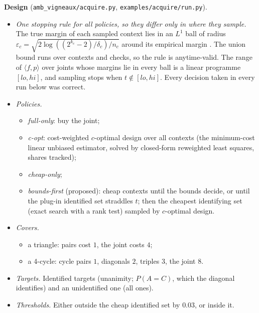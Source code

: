 \documentclass[11pt]{article}
\theoremstyle{definition}
\theoremstyle{remark}
\begin{document}
\textbf{Design} (\texttt{amb\_vigneaux/acquire.py}, \texttt{examples/acquire/run.py}).
\begin{itemize}
  \item \emph{One stopping rule for all policies, so they differ only in where they sample.} The true margin of each sampled context lies in an $L^1$ ball of radius $\varepsilon_c=\sqrt{2\log((2^{k_c}-2)/\delta_c)/n_c}$ around its empirical margin \cite{weissman03}. The union bound runs over contexts and checks, so the rule is anytime-valid. The range of $\langle f,p\rangle$ over joints whose margins lie in every ball is a linear programme $[lo,hi]$, and sampling stops when $t\notin[lo,hi]$. Every decision taken in every run below was correct.
  \item \emph{Policies.}
  \begin{itemize}
    \item \emph{full-only}: buy the joint;
    \item \emph{c-opt}: cost-weighted $c$-optimal design \cite{kieferwolfowitz60,pukelsheim93} over all contexts (the minimum-cost linear unbiased estimator, solved by closed-form reweighted least squares, shares tracked);
    \item \emph{cheap-only};
    \item \emph{bounds-first} (proposed): cheap contexts until the bounds decide, or until the plug-in identified set straddles $t$; then the cheapest identifying set (exact search with a rank test) sampled by $c$-optimal design.
  \end{itemize}
  \item \emph{Covers.}
  \begin{itemize}
    \item a triangle: pairs cost $1$, the joint costs $4$;
    \item a 4-cycle: cycle pairs $1$, diagonals $2$, triples $3$, the joint $8$.
  \end{itemize}
  \item \emph{Targets.} Identified targets (unanimity; $P(A=C)$, which the diagonal identifies) and an unidentified one (all ones).
  \item \emph{Thresholds.} Either outside the cheap identified set by $0.03$, or inside it.
\end{itemize}
\end{document}
